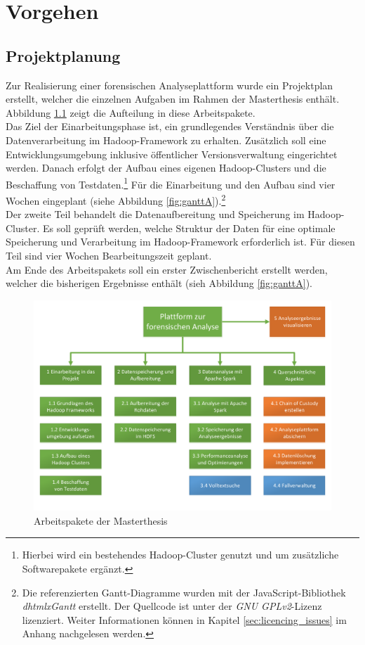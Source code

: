 \chapter{Vorgehen}
\label{ch:development_approach}

\section{Projektplanung}
\label{sec:project_plan}
Zur Realisierung einer forensischen Analyseplattform wurde ein Projektplan erstellt, welcher die einzelnen Aufgaben im Rahmen der Masterthesis enthält. Abbildung \ref{fig:workpackages} zeigt die Aufteilung in diese Arbeitspakete.\\
Das Ziel der Einarbeitungsphase ist, ein grundlegendes Verständnis über die Datenverarbeitung im Hadoop-Framework zu erhalten. Zusätzlich soll eine Entwicklungsumgebung inklusive öffentlicher Versionsverwaltung eingerichtet werden. Danach erfolgt der Aufbau eines eigenen Hadoop-Clusters und die Beschaffung von Testdaten.\footnote{Hierbei wird ein bestehendes Hadoop-Cluster genutzt und um zusätzliche Softwarepakete ergänzt.} Für die Einarbeitung und den Aufbau sind vier Wochen eingeplant (siehe Abbildung \ref{fig:ganttA}).\footnote{Die referenzierten Gantt-Diagramme wurden mit der JavaScript-Bibliothek \textit{dhtmlxGantt} erstellt. Der Quellcode ist unter der \textit{GNU GPLv2}-Lizenz lizenziert. Weiter Informationen können in Kapitel \ref{sec:licencing_issues} im Anhang nachgelesen werden.}\\

\noindent
Der zweite Teil behandelt die Datenaufbereitung und Speicherung im Hadoop-Cluster. Es soll geprüft werden, welche Struktur der Daten für eine optimale Speicherung und Verarbeitung im Hadoop-Framework erforderlich ist. Für diesen Teil sind vier Wochen Bearbeitungszeit geplant.\\
Am Ende des Arbeitspakets soll ein erster Zwischenbericht erstellt werden, welcher die bisherigen Ergebnisse enthält (sieh Abbildung \ref{fig:ganttA}).\\

\begin{figure}[ht]
  \centering
  \includegraphics[width=\textwidth]{./resource/Arbeitspakete.pdf}
  \caption{Arbeitspakete der Masterthesis}
  \label{fig:workpackages}
\end{figure}

